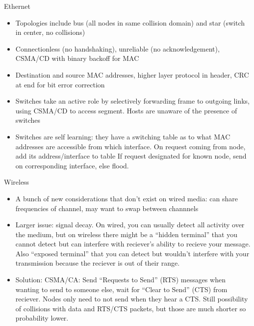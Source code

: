 \documentclass{beamer}
\begin{document}
\begin{frame}[t]{Ethernet}
    \begin{itemize}
        \item Topologies include \alert{bus} (all nodes in same collision domain) and \alert{star} (switch in center, no collisions)
        \item Connectionless (no handshaking), unreliable (no acknowledgement), CSMA/CD with binary backoff for MAC
        \item Destination and source MAC addresses, higher layer protocol in header, CRC at end for bit error correction
        \pause\item \alert{Switches} take an active role by selectively forwarding frame to outgoing links, using CSMA/CD to access segment. Hosts are unaware of the presence of switches
        \item Switches are \alert{self learning}: they have a switching table as to what MAC addresses are accessible from which interface. On request coming from node, add its address/interface to table If request designated for known node, send on corresponding interface, else flood.
    \end{itemize}
\end{frame}


\begin{frame}[t]{Wireless}
    \begin{itemize}
        \item A bunch of new considerations that don't exist on wired media: can share frequencies of channel, may want to swap between channnels
        \item Larger issue: signal decay. On wired, you can usually detect all activity over the medium, but on wireless there might be a ``hidden terminal'' that you cannot detect but can interfere with reciever's ability to recieve your message. Also ``exposed terminal'' that you can detect but wouldn't interfere with your transmission because the reciever is out of their range.
        \item Solution: CSMA/CA: Send ``Requests to Send'' (RTS) messages when wanting to send to someone else, wait for ``Clear to Send'' (CTS) from reciever. Nodes only need to not send when they hear a CTS. Still possibility of collisions with data and RTS/CTS packets, but those are much shorter so probability lower.
    \end{itemize}
\end{frame}
\end{document}
